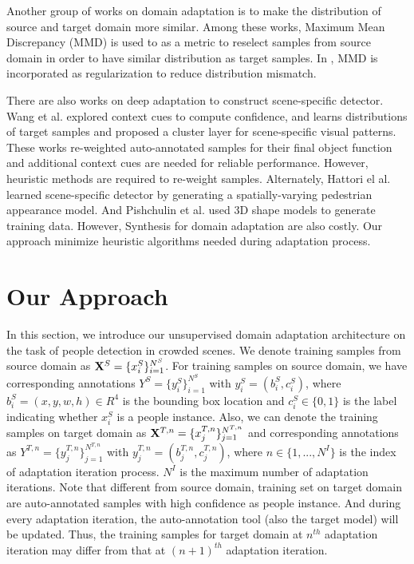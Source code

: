 \documentclass[runningheads]{llncs}
\begin{document}
Another group of works \cite{huang2006correcting,gretton2009covariate,gong2013connecting} on domain adaptation is to make the distribution of source and target domain more similar. Among these works, Maximum Mean Discrepancy (MMD) is used to as a metric to reselect samples from source domain in order to have similar distribution as target samples. In \cite{ghifary2014domain}, MMD is incorporated as regularization to reduce distribution mismatch.

There are also works on deep adaptation to construct scene-specific detector. Wang et al.\cite{wang2014scene} explored context cues to compute confidence, and \cite{zeng2014deep} learns distributions of target samples and proposed a cluster layer for scene-specific visual patterns. These works re-weighted auto-annotated samples for their final object function and additional context cues are needed for reliable performance. However, heuristic methods are required to re-weight samples. Alternately, Hattori el al. \cite{hattori2015learning} learned scene-specific detector by generating a spatially-varying pedestrian appearance model. And Pishchulin et al. \cite{pishchulin2011learning} used 3D shape models to generate training data. However, Synthesis for domain adaptation are also costly. Our approach minimize heuristic algorithms needed during adaptation process.

\section{Our Approach}
\label{section:Our Approach}

In this section, we introduce our unsupervised domain adaptation architecture on the task of people detection in crowded scenes. We denote training samples from source domain as ${\bf X}^{S} = \{x^{S}_{i}\}^{N^{S}}_{i=1}$. For training samples on source domain, we have corresponding annotations $Y^{S} = \{y^{S}_{i}\}^{N^{S}}_{i=1}$ with $y^{S}_{i} = (b^{S}_{i},c^{S}_{i})$, where $b^{S}_{i} = (x,y,w,h) \in R^{4}$ is the bounding box location and $c^{S}_{i} \in \{0,1\}$ is the label indicating whether $x^{S}_{i}$ is a people instance. Also, we can denote the training samples on target domain as ${\bf X}^{T,n} = \{x^{T,n}_{j}\}^{N^{T,n}}_{j=1}$ and corresponding annotations as $Y^{T,n} = \{y^{T,n}_{j}\}^{N^{T,n}}_{j=1}$ with $y^{T,n}_{j} = (b^{T,n}_{j},c^{T,n}_{j})$, where $n \in \{1,...,N^{I}\}$ is the index of adaptation iteration process. $N^{I}$ is the maximum number of adaptation iterations. Note that different from source domain, training set on target domain are auto-annotated samples with high confidence as people instance. And during every adaptation iteration, the auto-annotation tool (also the target model) will be updated. Thus, the training samples for target domain at $n^{th}$ adaptation iteration may differ from that at $(n+1)^{th}$ adaptation iteration.
\end{document}
